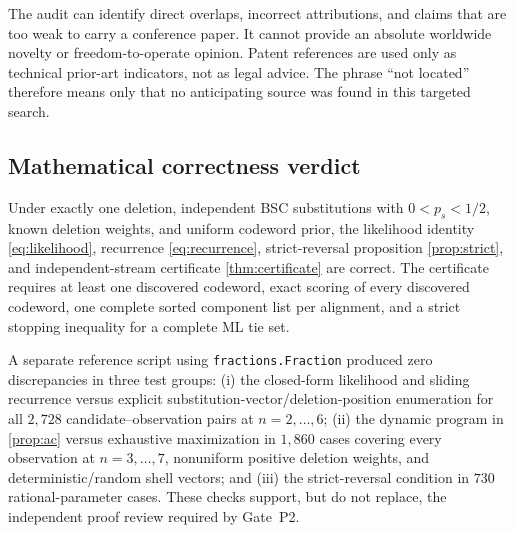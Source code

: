 \documentclass[11pt]{article}
\theoremstyle{definition}
\theoremstyle{remark}
\begin{document}
\begin{riskbox}
The audit can identify direct overlaps, incorrect attributions, and claims that are too weak to carry a conference paper. It cannot provide an absolute worldwide novelty or freedom-to-operate opinion. Patent references are used only as technical prior-art indicators, not as legal advice. The phrase ``not located'' therefore means only that no anticipating source was found in this targeted search.
\end{riskbox}

\subsection{Mathematical correctness verdict}

\begin{gatebox}
Under exactly one deletion, independent BSC substitutions with $0<p_s<1/2$, known deletion weights, and uniform codeword prior, the likelihood identity \cref{eq:likelihood}, recurrence \cref{eq:recurrence}, strict-reversal proposition \cref{prop:strict}, and independent-stream certificate \cref{thm:certificate} are correct. The certificate requires at least one discovered codeword, exact scoring of every discovered codeword, one complete sorted component list per alignment, and a strict stopping inequality for a complete ML tie set.
\end{gatebox}

\begin{freezebox}
A separate reference script using \texttt{fractions.Fraction} produced zero discrepancies in three test groups: (i) the closed-form likelihood and sliding recurrence versus explicit substitution-vector/deletion-position enumeration for all $2{,}728$ candidate--observation pairs at $n=2,\ldots,6$; (ii) the dynamic program in \cref{prop:ac} versus exhaustive maximization in $1{,}860$ cases covering every observation at $n=3,\ldots,7$, nonuniform positive deletion weights, and deterministic/random shell vectors; and (iii) the strict-reversal condition in $730$ rational-parameter cases. These checks support, but do not replace, the independent proof review required by Gate~P2.
\end{freezebox}
\end{document}
